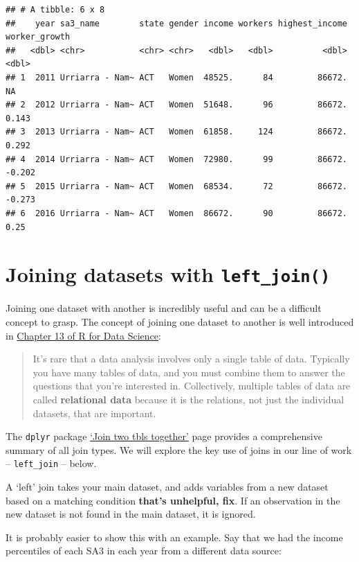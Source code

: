\documentclass[
]{book}
\begin{document}
\begin{verbatim}
## # A tibble: 6 x 8
##    year sa3_name        state gender income workers highest_income worker_growth
##   <dbl> <chr>           <chr> <chr>   <dbl>   <dbl>          <dbl>         <dbl>
## 1  2011 Urriarra - Nam~ ACT   Women  48525.      84         86672.        NA    
## 2  2012 Urriarra - Nam~ ACT   Women  51648.      96         86672.         0.143
## 3  2013 Urriarra - Nam~ ACT   Women  61858.     124         86672.         0.292
## 4  2014 Urriarra - Nam~ ACT   Women  72980.      99         86672.        -0.202
## 5  2015 Urriarra - Nam~ ACT   Women  68534.      72         86672.        -0.273
## 6  2016 Urriarra - Nam~ ACT   Women  86672.      90         86672.         0.25
\end{verbatim}

\hypertarget{joining-datasets-with-left_join}{%
\section{\texorpdfstring{Joining datasets with \texttt{left\_join()}}{Joining datasets with left\_join()}}\label{joining-datasets-with-left_join}}

Joining one dataset with another is incredibly useful and can be a difficult concept to grasp. The concept of joining one dataset to another is well introduced in \href{https://r4ds.had.co.nz/relational-data.html}{Chapter 13 of R for Data Science}:

\begin{quote}
It's rare that a data analysis involves only a single table of data. Typically you have many tables of data, and you must combine them to answer the questions that you're interested in. Collectively, multiple tables of data are called \textbf{relational data} because it is the relations, not just the individual datasets, that are important.
\end{quote}

The \texttt{dplyr} package \href{https://dplyr.tidyverse.org/reference/join.html}{`Join two tbls together'} page provides a comprehensive summary of all join types. We will explore the key use of joins in our line of work -- \texttt{left\_join} -- below.

A `left' join takes your main dataset, and adds variables from a new dataset based on a matching condition \textbf{that's unhelpful, fix}. If an observation in the new dataset is not found in the main dataset, it is ignored.

It is probably easier to show this with an example. Say that we had the income percentiles of each SA3 in each year from a different data source:
\end{document}
